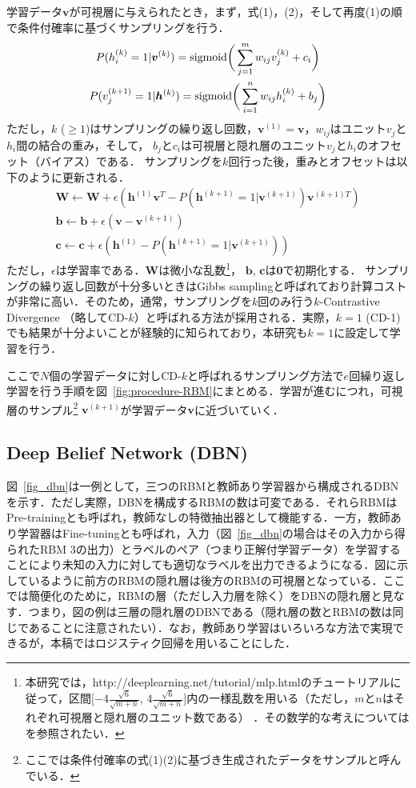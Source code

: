 \documentclass[japanese]{jnlp_1.4}
\begin{document}
学習データ$\bm{v}$が可視層に与えられたとき，まず，式(1)，(2)，そして再度(1)の順で条件付確率に基づくサンプリングを行う．
{\allowdisplaybreaks
\begin{gather}
P(h_i^{(k)}=1|\bm{v}^{(k)})={\rm sigmoid}\bigg(\sum_{j=1}^m w_{ij}v_j^{(k)}+c_i\bigg) \\
P(v_j^{(k+1)}=1|\bm{h}^{(k)})={\rm sigmoid}\bigg(\sum_{i=1}^n w_{ij}h_i^{(k)}+b_j\bigg)
\end{gather}
}
ただし，$k$ ($\geq 1$)はサンプリングの繰り返し回数，$\bm{v}^{(1)}=\bm{v}$，$w_{ij}$はユニット$v_j$と$h_i$間の結合の重み，そして， $b_j$と$c_i$は可視層と隠れ層のユニット$v_j$と$h_i$のオフセット（バイアス）である． 
サンプリングを$k$回行った後，重みとオフセットは以下のように更新される．
\begin{gather}
\bm{W} \leftarrow \bm{W} + \epsilon (\bm{h}^{(1)}\bm{v}^{T}- P(\bm{h}^{(k+1)}=1|\bm{v}^{(k+1)})\bm{v}^{(k+1)T}) \\
\bm{b} \leftarrow \bm{b} + \epsilon(\bm{v}-\bm{v}^{(k+1)}) \\
\bm{c} \leftarrow \bm{c} + \epsilon(\bm{h}^{(1)}-P(\bm{h}^{(k+1)}=1|\bm{v}^{(k+1)}))
\end{gather}
ただし，$\epsilon$は学習率である．$\bm{W}$は微小な乱数\footnote{本研究では，http://deeplearning.net/tutorial/mlp.htmlのチュートリアルに従って，区間[$-4\frac{\sqrt{6}}{\sqrt{m+n}}$, $4\frac{\sqrt{6}}{\sqrt{m+n}}$]内の一様乱数を用いる（ただし，$m$と$n$はそれぞれ可視層と隠れ層のユニット数である）
．その数学的な考えについては\cite{Glorot:10}を参照されたい．}， $\bm{b}$, $\bm{c}$は$\bm{0}$で初期化する． 
サンプリングの繰り返し回数が十分多いときはGibbs samplingと呼ばれており計算コストが非常に高い．そのため，通常，サンプリングを$k$回のみ行う$k$-Contrastive Divergence （略してCD-$k$）と呼ばれる方法が採用される．実際，$k=1$ (CD-1)でも結果が十分よいことが経験的に知られており\cite{Bengio:09}，本研究も$k=1$に設定して学習を行う．

ここで$N$個の学習データに対しCD-$k$と呼ばれるサンプリング方法で$e$回繰り返し学習を行う手順を図~\ref{fig:procedure-RBM}にまとめる．学習が進むにつれ，可視層のサンプル\footnote{ここでは条件付確率の式(1)(2)に基づき生成されたデータをサンプルと呼んでいる．} $\bm{v}^{(k+1)}$が学習データ$\bm{v}$に近づいていく．


\subsection{Deep Belief Network (DBN)}

図~\ref{fig_dbn}は一例として，三つのRBMと教師あり学習器から構成されるDBNを示す．ただし実際，DBNを構成するRBMの数は可変である．それらRBMはPre-trainingとも呼ばれ，教師なしの特徴抽出器として機能する．一方，教師あり学習器はFine-tuningとも呼ばれ，入力（図~\ref{fig_dbn}の場合はその入力から得られたRBM 3の出力）とラベルのペア（つまり正解付学習データ）を学習することにより未知の入力に対しても適切なラベルを出力できるようになる．図に示しているように前方のRBMの隠れ層は後方のRBMの可視層となっている．ここでは簡便化のために，RBMの層（ただし入力層を除く）をDBNの隠れ層と見なす．つまり，図の例は三層の隠れ層のDBNである（隠れ層の数とRBMの数は同じであることに注意されたい）．なお，教師あり学習はいろいろな方法で実現できるが，本稿ではロジスティク回帰を用いることにした．
\end{document}
